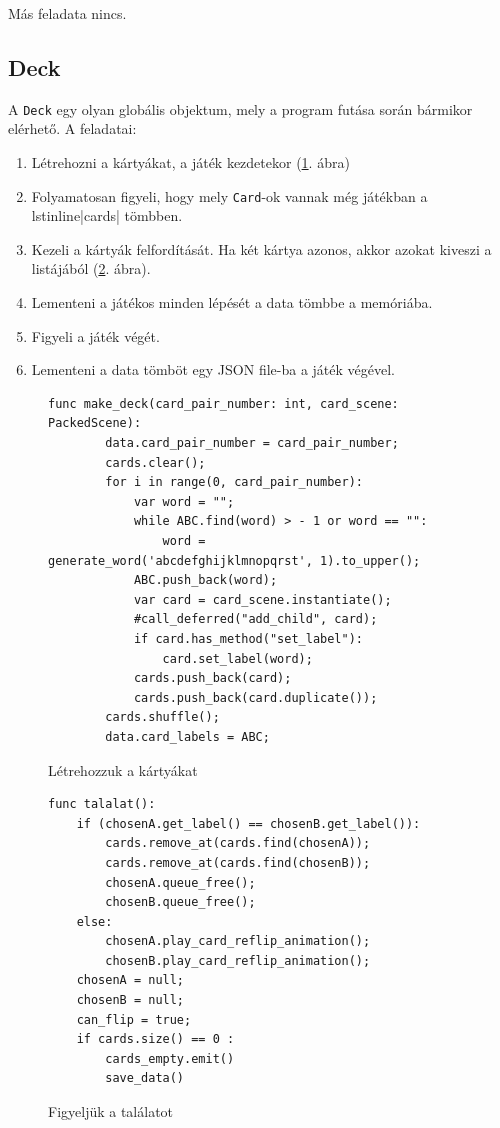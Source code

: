Más feladata nincs. 


\subsection{Deck}
A \lstinline|Deck| egy olyan globális objektum, mely a program futása során bármikor elérhető. A feladatai: 
\begin{enumerate}
\item Létrehozni a kártyákat, a játék kezdetekor (\ref{code:make_deck}. ábra)
\item Folyamatosan figyeli, hogy mely \lstinline|Card|-ok vannak még játékban a lstinline|cards| tömbben.
\item Kezeli a kártyák felfordítását. Ha két kártya azonos, akkor azokat kiveszi a listájából (\ref{code:talalat}. ábra).
\item Lementeni a játékos minden lépését a data tömbbe a memóriába. 
\item Figyeli a játék végét.
\item Lementeni a data tömböt egy JSON file-ba a játék végével.
\end{enumerate}

\begin{figure}[h]
    \centering
    \begin{lstlisting}[language=GDScript]
    func make_deck(card_pair_number: int, card_scene: PackedScene):
        data.card_pair_number = card_pair_number;
        cards.clear();
        for i in range(0, card_pair_number):
            var word = "";
            while ABC.find(word) > - 1 or word == "":
                word = generate_word('abcdefghijklmnopqrst', 1).to_upper();
            ABC.push_back(word);
            var card = card_scene.instantiate();
            #call_deferred("add_child", card);
            if card.has_method("set_label"):
                card.set_label(word);
            cards.push_back(card);
            cards.push_back(card.duplicate());
        cards.shuffle();
        data.card_labels = ABC;
    \end{lstlisting}
    \caption{Létrehozzuk a kártyákat}
    \label{code:make_deck}
\end{figure}
\begin{figure}[h]
    \centering
    \begin{lstlisting}[language=GDScript]
func talalat():
	if (chosenA.get_label() == chosenB.get_label()):
		cards.remove_at(cards.find(chosenA));
		cards.remove_at(cards.find(chosenB));
		chosenA.queue_free();
		chosenB.queue_free();
	else:
		chosenA.play_card_reflip_animation();
		chosenB.play_card_reflip_animation();
	chosenA = null;
	chosenB = null;
	can_flip = true;
	if cards.size() == 0 :
		cards_empty.emit()
		save_data()
    \end{lstlisting}
    \caption{Figyeljük a találatot}
    \label{code:talalat}
\end{figure}


